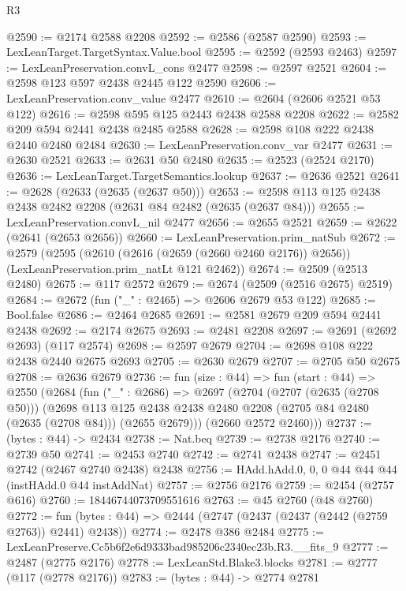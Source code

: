 \begin{lexlean}{R3}
\begin{coremodule}
@2590 := @2174 @2588 @2208
@2592 := @2586 (@2587 @2590)
@2593 := LexLeanTarget.TargetSyntax.Value.bool
@2595 := @2592 (@2593 @2463)
@2597 := LexLeanPreservation.convL_cons @2477
@2598 := @2597 @2521
@2604 := @2598 @123 @597 @2438 @2445 @122 @2590
@2606 := LexLeanPreservation.conv_value @2477
@2610 := @2604 (@2606 @2521 @53 @122)
@2616 := @2598 @595 @125 @2443 @2438 @2588 @2208
@2622 := @2582 @209 @594 @2441 @2438 @2485 @2588
@2628 := @2598 @108 @222 @2438 @2440 @2480 @2484
@2630 := LexLeanPreservation.conv_var @2477
@2631 := @2630 @2521
@2633 := @2631 @50 @2480
@2635 := @2523 (@2524 @2170)
@2636 := LexLeanTarget.TargetSemantics.lookup
@2637 := @2636 @2521
@2641 := @2628 (@2633 (@2635 (@2637 @50)))
@2653 := @2598 @113 @125 @2438 @2438 @2482 @2208 (@2631 @84 @2482 (@2635 (@2637 @84)))
@2655 := LexLeanPreservation.convL_nil @2477
@2656 := @2655 @2521
@2659 := @2622 (@2641 (@2653 @2656))
@2660 := LexLeanPreservation.prim_natSub
@2672 := @2579
    (@2595
      (@2610 (@2616 (@2659 (@2660 @2460 @2176)) @2656))
      (LexLeanPreservation.prim_natLt @121 @2462))
@2674 := @2509 (@2513 @2480)
@2675 := @117 @2572
@2679 := @2674 (@2509 (@2516 @2675) @2519)
@2684 := @2672 (fun ("_" : @2465) => @2606 @2679 @53 @122)
@2685 := Bool.false
@2686 := @2464 @2685
@2691 := @2581 @2679 @209 @594 @2441 @2438
@2692 := @2174 @2675
@2693 := @2481 @2208
@2697 := @2691 (@2692 @2693) (@117 @2574)
@2698 := @2597 @2679
@2704 := @2698 @108 @222 @2438 @2440 @2675 @2693
@2705 := @2630 @2679
@2707 := @2705 @50 @2675
@2708 := @2636 @2679
@2736 := fun (size : @44) =>
  fun (start : @44) =>
  @2550
    (@2684
      (fun ("_" : @2686) =>
      @2697
        (@2704
          (@2707 (@2635 (@2708 @50)))
          (@2698
            @113
            @125
            @2438
            @2438
            @2480
            @2208
            (@2705 @84 @2480 (@2635 (@2708 @84)))
            (@2655 @2679)))
        (@2660 @2572 @2460)))
@2737 := (bytes : @44) -> @2434
@2738 := Nat.beq
@2739 := @2738 @2176
@2740 := @2739 @50
@2741 := @2453 @2740
@2742 := @2741 @2438
@2747 := @2451 @2742 (@2467 @2740 @2438) @2438
@2756 := HAdd.hAdd.{0, 0, 0} @44 @44 @44 (instHAdd.{0} @44 instAddNat)
@2757 := @2756 @2176
@2759 := @2454 (@2757 @616)
@2760 := 18446744073709551616
@2763 := @45 @2760 (@48 @2760)
@2772 := fun (bytes : @44) => @2444 (@2747 (@2437 (@2437 (@2442 (@2759 @2763)) @2441) @2438))
@2774 := @2478 @386 @2484
@2775 := LexLeanPreserve.Cc5b6f2e6d9333bad985206c2340ec23b.R3.__fits_9
@2777 := @2487 (@2775 @2176)
@2778 := LexLeanStd.Blake3.blocks
@2781 := @2777 (@117 (@2778 @2176))
@2783 := (bytes : @44) -> @2774 @2781

\end{coremodule}
\end{lexlean}
